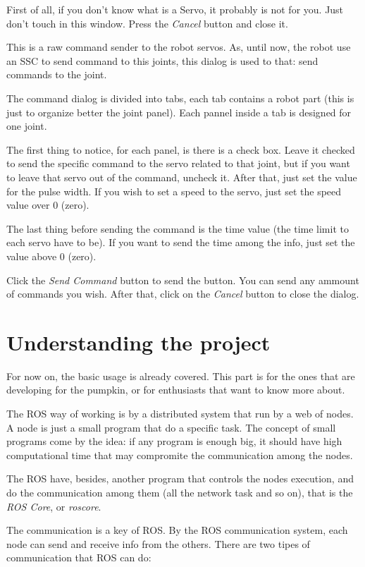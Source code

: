 \documentclass[oneside,a4paper,titlepage]{article}
\begin{document}
First of all, if you don't know what is a Servo, it probably is not for you. Just don't touch in this window. Press the \emph{Cancel} button and close it.

This is a raw command sender to the robot servos. As, until now, the robot use an SSC to send command to this joints, this dialog is used to that: send commands to the joint.

The command dialog is divided into tabs, each tab contains a robot part (this is just to organize better the joint panel). Each pannel inside a tab is designed for one joint.

The first thing to notice, for each panel, is there is a check box. Leave it checked to send the specific command to the servo related to that joint, but if you want to leave that servo out of the command, uncheck it. After that, just set the value for the pulse width. If you wish to set a speed to the servo, just set the speed value over $0$ (zero).

The last thing before sending the command is the time value (the time limit to each servo have to be). If you want to send the time among the info, just set the value above $0$ (zero).

Click the \emph{Send Command} button to send the button. You can send any ammount of commands you wish. After that, click on the \emph{Cancel} button to close the dialog.

\newpage
\section{Understanding the project}

For now on, the basic usage is already covered. This part is for the ones that are developing for the pumpkin, or for enthusiasts that want to know more about.

The ROS way of working is by a distributed system that run by a web of nodes. A node is just a small program that do a specific task. The concept of small programs come by the idea: if any program is enough big, it should have high computational time that may compromite the communication among the nodes.

The ROS have, besides, another program that controls the nodes execution, and do the communication among them (all the network task and so on), that is the \emph{ROS Core}, or \emph{roscore}.

The communication is a key of ROS. By the ROS communication system, each node can send and receive info from the others. There are two tipes of communication that ROS can do:
\end{document}

